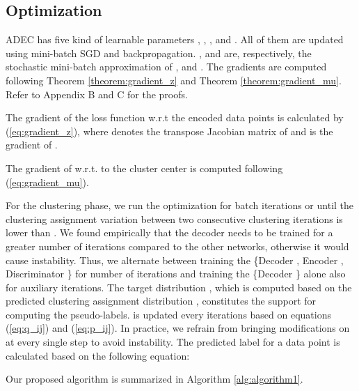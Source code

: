 \documentclass{article}
\begin{document}
\subsection{Optimization}

ADEC has five kind of learnable parameters , , ,  and . All of them are updated using mini-batch SGD and backpropagation. ,  and  are, respectively, the stochastic mini-batch approximation of ,  and . The gradients are computed following Theorem \ref{theorem:gradient_z} and Theorem \ref{theorem:gradient_mu}. Refer to Appendix B and C for the proofs.

\begin{theorem} \label{theorem:gradient_z}
The gradient of the loss function  w.r.t the encoded data points  is calculated by (\ref{eq:gradient_z}), where  denotes the transpose Jacobian matrix of  and  is the gradient of . 
    
\end{theorem}

\begin{theorem} \label{theorem:gradient_mu}
The gradient of  w.r.t. to the cluster center  is computed following (\ref{eq:gradient_mu}).
    
\end{theorem}


For the clustering phase, we run the optimization for  batch iterations or until the clustering assignment variation between two consecutive clustering iterations is lower than . We found empirically that the decoder needs to be trained for a greater number of iterations compared to the other networks, otherwise it would cause instability. Thus, we alternate between training the \{Decoder , Encoder , Discriminator \} for  number of iterations and training the \{Decoder \} alone also for  auxiliary iterations. The target distribution , which is computed based on the predicted clustering assignment distribution , constitutes the support for computing the pseudo-labels.  is updated every  iterations based on equations (\ref{eq:q_ij}) and (\ref{eq:p_ij}). In practice, we refrain from bringing modifications on  at every single step to avoid instability. The predicted label  for a data point  is calculated based on the following equation: 



Our proposed algorithm is summarized in Algorithm \ref{alg:algorithm1}. 
\end{document}
